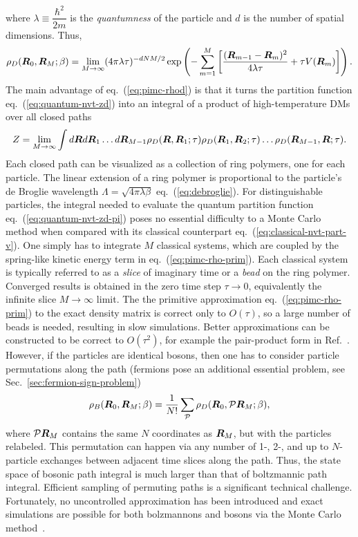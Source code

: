 where $\lambda\equiv\dfrac{\hbar^2}{2m}$ is the \emph{quantumness} of the particle and $d$ is the number of spatial dimensions. Thus,
\begin{align}
\rho_D(\boldsymbol{R}_0,\boldsymbol{R}_M;\beta) = \lim\limits_{M\rightarrow\infty} (4\pi\lambda\tau)^{-dNM/2}\exp\left(
-\sum\limits_{m=1}^M \left[
\dfrac{(\boldsymbol{R}_{m-1}-\boldsymbol{R}_m)^2}{4\lambda\tau} + \tau V(\boldsymbol{R}_m)
\right]
\right).
\end{align}
The main advantage of eq.~(\ref{eq:pimc-rhod}) is that it turns the partition function eq.~(\ref{eq:quantum-nvt-zd}) into an integral of a product of high-temperature DMs over all closed paths
\begin{align} \label{eq:quantum-nvt-zd-pi}
Z=\lim\limits_{M\rightarrow\infty} \int d\boldsymbol{R} d\boldsymbol{R}_1\dots d\boldsymbol{R}_{M-1}
\rho_D(\boldsymbol{R},\boldsymbol{R}_1;\tau)\rho_D(\boldsymbol{R}_1,\boldsymbol{R}_2;\tau)\dots\rho_D(\boldsymbol{R}_{M-1},\boldsymbol{R};\tau).
\end{align}
Each closed path can be visualized as a collection of ring polymers, one for each particle. The linear extension of a ring polymer is proportional to the particle's de Broglie wavelength $\Lambda=\sqrt{4\pi\lambda\beta}$ eq.~(\ref{eq:debroglie}).
For distinguishable particles, the integral needed to evaluate the quantum partition function eq.~(\ref{eq:quantum-nvt-zd-pi}) poses no essential difficulty to a Monte Carlo method when compared with its classical counterpart eq.~(\ref{eq:classical-nvt-part-v}).
One simply has to integrate $M$ classical systems, which are coupled by the spring-like kinetic energy term in eq.~(\ref{eq:pimc-rho-prim}).
Each classical system is typically referred to as a \emph{slice} of imaginary time or a \emph{bead} on the ring polymer.
Converged results is obtained in the zero time step $\tau\rightarrow0$, equivalently the infinite slice $M\rightarrow\infty$ limit.
The the primitive approximation eq.~(\ref{eq:pimc-rho-prim}) to the exact density matrix is correct only to $O(\tau)$, so a large number of beads is needed, resulting in slow simulations.
Better approximations can be constructed to be correct to $O(\tau^2)$, for example the pair-product form in Ref.~\cite{Ceperley1995}.
However, if the particles are identical bosons, then one has to consider particle permutations along the path (fermions pose an additional essential problem, see Sec.~\ref{sec:fermion-sign-problem})
\begin{align}
\rho_B(\boldsymbol{R}_0,\boldsymbol{R}_M;\beta) = \frac{1}{N!}\sum\limits_{\mathcal{P}} \rho_D(\boldsymbol{R}_0, \mathcal{P}\boldsymbol{R}_M;\beta),
\end{align}
where $\mathcal{P}\boldsymbol{R}_M$ contains the same $N$ coordinates as $\boldsymbol{R}_M$, but with the particles relabeled. This permutation can happen via any number of 1-, 2-, and up to $N$-particle exchanges between adjacent time slices along the path. Thus, the state space of bosonic path integral is much larger than that of boltzmannic path integral. Efficient sampling of permuting paths is a significant technical challenge. Fortunately, no uncontrolled approximation has been introduced and exact simulations are possible for both bolzmannons and bosons via the Monte Carlo method~\cite{Ceperley1995,Meldgin2016}.


